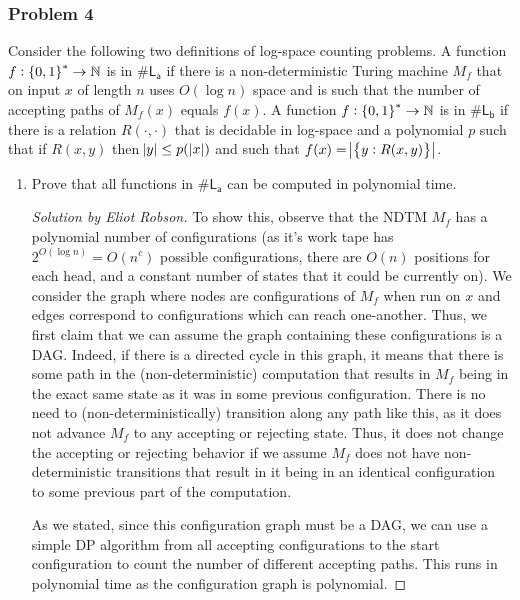 \documentclass{article}
\newenvironment{solution}[1]{\begin{proof}[Solution by #1]}{\end{proof}}
\newcommand{\Sharp}[1]{\mathsf{\# #1}}
\newcommand{\Naturals}{\mathbb{N}}
\begin{document}
\subsubsection{Problem 4}
Consider the following two definitions of log-space counting problems. A function \(f : \set{0,1}^* \to \Naturals\) is in \(\Sharp{L_a}\) if there is a non-deterministic Turing machine \(M_f\) that on input \(x\) of length \(n\) uses \(O(\log n)\) space and is such that the number of accepting paths of \(M_f (x)\) equals \(f(x)\). A function \(f : \set{0,1}^* \to \Naturals\) is in \(\Sharp{L_b}\) if there is a relation \(R(\cdot, \cdot)\) that is decidable in log-space and a polynomial \(p\) such that if \(R(x,y)\) then \(\abs{y} \leq p(\abs[0]{x})\) and such that \(f(x) = \abs[1]{\set{y : R(x,y)}}\).

\begin{enumerate}
	\item Prove that all functions in \(\Sharp{L_a}\) can be computed in polynomial time.
	
	\begin{solution}{Eliot Robson}
		To show this, observe that the NDTM \(M_f\) has a polynomial number of configurations (as it's work tape has \(2^{O(\log n)} = O(n^c)\) possible configurations, there are \(O(n)\) positions for each head, and a constant number of states that it could be currently on). We consider the graph where nodes are configurations of \(M_f\) when run on \(x\) and edges correspond to configurations which can reach one-another. Thus, we first claim that we can assume the graph containing these configurations is a DAG. Indeed, if there is a directed cycle in this graph, it means that there is some path in the (non-deterministic) computation that results in \(M_f\) being in the exact same state as it was in some previous configuration. There is no need to (non-deterministically) transition along any path like this, as it does not advance \(M_f\) to any accepting or rejecting state. Thus, it does not change the accepting or rejecting behavior if we assume \(M_f\) does not have non-deterministic transitions that result in it being in an identical configuration to some previous part of the computation.
        
        As we stated, since this configuration graph must be a DAG, we can use a simple DP algorithm from all accepting configurations to the start configuration to count the number of different accepting paths. This runs in polynomial time as the configuration graph is polynomial.
	\end{solution}
	

\end{enumerate}
\end{document}
